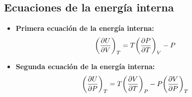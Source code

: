 \subsection{Ecuaciones de la energía interna}
\begin{itemize}
\item \textbf{Primera ecuación de la energía interna:}
\begin{align}
\qty(\pdv{U}{V})_T=T\qty(\pdv{P}{T})_V-P
\end{align}
\item \textbf{Segunda ecuación de la energía interna:}
\begin{align}
\qty(\pdv{U}{P})_T=T\qty(\pdv{V}{T})_P-P\qty(\pdv{V}{P})_T
\end{align}
\end{itemize}








